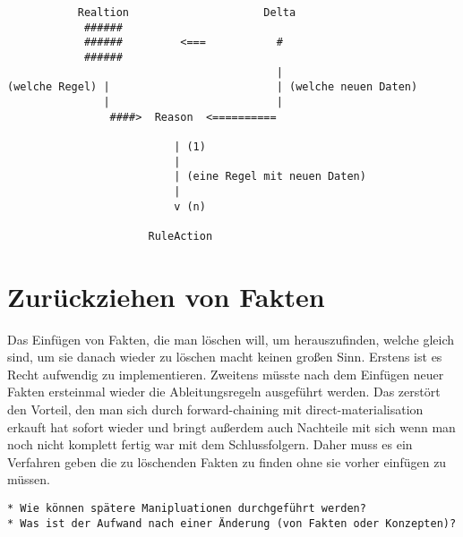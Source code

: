 \begin{verbatim}
           Realtion                     Delta
            ######
            ######         <===           #
            ######
                                          |
(welche Regel) |                          | (welche neuen Daten)
               |                          |
                ####>  Reason  <==========

                          | (1)
                          |
                          | (eine Regel mit neuen Daten)
                          |
                          v (n)

                      RuleAction
\end{verbatim}







\section{Zurückziehen von Fakten}
Das Einfügen von Fakten, die man löschen will, um herauszufinden, welche gleich sind, um sie danach wieder zu löschen macht keinen großen Sinn. Erstens ist es Recht aufwendig zu implementieren. Zweitens müsste nach dem Einfügen neuer Fakten ersteinmal wieder die Ableitungsregeln ausgeführt werden. Das zerstört den Vorteil, den man sich durch forward-chaining mit direct-materialisation erkauft hat sofort wieder und bringt außerdem auch Nachteile mit sich wenn man noch nicht komplett fertig war mit dem Schlussfolgern.
Daher muss es ein Verfahren geben die zu löschenden Fakten zu finden ohne sie vorher einfügen zu müssen.
\begin{verbatim} 
* Wie können spätere Manipluationen durchgeführt werden?
* Was ist der Aufwand nach einer Änderung (von Fakten oder Konzepten)?
\end{verbatim}
